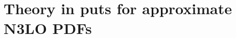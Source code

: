 \documentclass[aspectratio=169, 9pt,t]{beamer}
\begin{document}







\section{Theory in puts for approximate N3LO PDFs}
\end{document}
